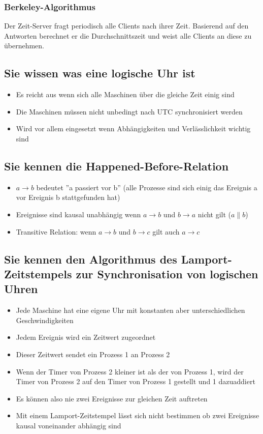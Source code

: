 \subsubsection{Berkeley-Algorithmus}

Der Zeit-Server fragt periodisch alle Clients nach ihrer Zeit. Basierend auf den Antworten berechnet er die Durchschnittszeit und weist alle Clients an diese zu übernehmen.

\subsection{Sie wissen was eine logische Uhr ist}

\begin{itemize}
	\item Es reicht aus wenn sich alle Maschinen über die gleiche Zeit einig sind
	\item Die Maschinen müssen nicht unbedingt nach UTC synchronisiert werden
	\item Wird vor allem eingesetzt wenn Abhängigkeiten und Verlässlichkeit wichtig sind
\end{itemize}

\subsection{Sie kennen die Happened-Before-Relation}

\begin{itemize}
	\item $a \rightarrow b$ bedeutet ''a passiert vor b'' (alle Prozesse sind sich einig das Ereignis a vor Ereignis b stattgefunden hat)
	\item Ereignisse sind kausal unabhängig wenn $a \rightarrow b$ und $b \rightarrow a$ nicht gilt ($a \parallel b$)
	\item Transitive Relation: wenn $a \rightarrow b$ und $b \rightarrow c$ gilt auch $a \rightarrow c$
\end{itemize}

\subsection{Sie kennen den Algorithmus des Lamport-Zeitstempels zur Synchronisation von logischen Uhren}

\begin{itemize}
	\item Jede Maschine hat eine eigene Uhr mit konstanten aber unterschiedlichen Geschwindigkeiten
	\item Jedem Ereignis wird ein Zeitwert zugeordnet
	\item Dieser Zeitwert sendet ein Prozess 1 an Prozess 2
	\item Wenn der Timer von Prozess 2 kleiner ist als der von Prozess 1, wird der Timer von Prozess 2 auf den Timer von Prozess 1 gestellt und 1 dazuaddiert
	\item Es können also nie zwei Ereignisse zur gleichen Zeit auftreten
	\item Mit einem Lamport-Zeitstempel lässt sich nicht bestimmen ob zwei Ereignisse kausal voneinander abhängig sind
\end{itemize}

